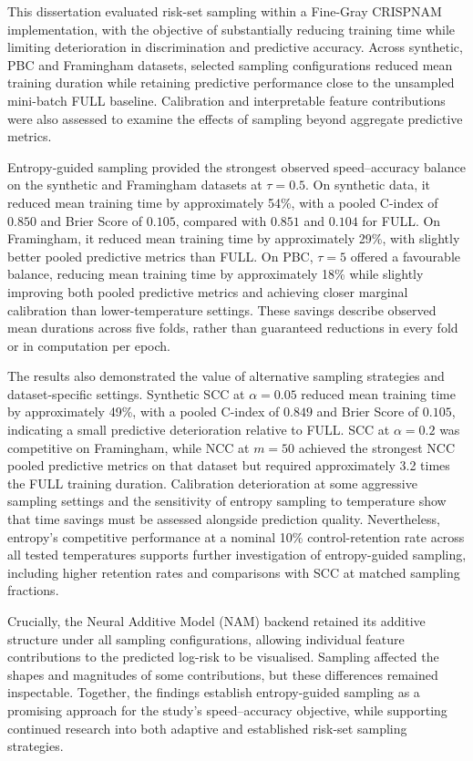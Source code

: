 \documentclass[a4paper,twoside,12pt]{report}
\begin{document}
This dissertation evaluated risk-set sampling within a Fine-Gray CRISPNAM implementation, with the objective of substantially reducing training time while limiting deterioration in discrimination and predictive accuracy. Across synthetic, PBC and Framingham datasets, selected sampling configurations reduced mean training duration while retaining predictive performance close to the unsampled mini-batch FULL baseline. Calibration and interpretable feature contributions were also assessed to examine the effects of sampling beyond aggregate predictive metrics.

Entropy-guided sampling provided the strongest observed speed--accuracy balance on the synthetic and Framingham datasets at $\tau=0.5$. On synthetic data, it reduced mean training time by approximately 54\%, with a pooled C-index of $0.850$ and Brier Score of $0.105$, compared with $0.851$ and $0.104$ for FULL. On Framingham, it reduced mean training time by approximately 29\%, with slightly better pooled predictive metrics than FULL. On PBC, $\tau=5$ offered a favourable balance, reducing mean training time by approximately 18\% while slightly improving both pooled predictive metrics and achieving closer marginal calibration than lower-temperature settings. These savings describe observed mean durations across five folds, rather than guaranteed reductions in every fold or in computation per epoch.

The results also demonstrated the value of alternative sampling strategies and dataset-specific settings. Synthetic SCC at $\alpha=0.05$ reduced mean training time by approximately 49\%, with a pooled C-index of $0.849$ and Brier Score of $0.105$, indicating a small predictive deterioration relative to FULL. SCC at $\alpha=0.2$ was competitive on Framingham, while NCC at $m=50$ achieved the strongest NCC pooled predictive metrics on that dataset but required approximately 3.2 times the FULL training duration. Calibration deterioration at some aggressive sampling settings and the sensitivity of entropy sampling to temperature show that time savings must be assessed alongside prediction quality. Nevertheless, entropy's competitive performance at a nominal 10\% control-retention rate across all tested temperatures supports further investigation of entropy-guided sampling, including higher retention rates and comparisons with SCC at matched sampling fractions.

Crucially, the Neural Additive Model (NAM) backend retained its additive structure under all sampling configurations, allowing individual feature contributions to the predicted log-risk to be visualised. Sampling affected the shapes and magnitudes of some contributions, but these differences remained inspectable. Together, the findings establish entropy-guided sampling as a promising approach for the study's speed--accuracy objective, while supporting continued research into both adaptive and established risk-set sampling strategies.
\end{document}
